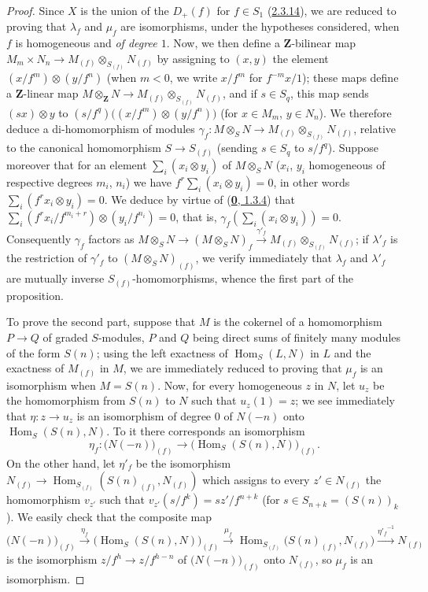 \begin{proof}
Since $X$ is the union of the $D_+(f)$ for $f\in S_1$
(\hyperref[II.2.3.14]{2.3.14}), we are reduced to proving that
$\lambda_f$ and $\mu_f$ are isomorphisms, under the hypotheses considered,
when $f$ is homogeneous and \emph{of degree $1$}. Now, we then define a
$\mathbf{Z}$-bilinear map $M_m\times N_n\longrightarrow M_{(f)}\otimes_{S_{(f)}}N_{(f)}$
by assigning to $(x,y)$ the element
$(x/f^m)\otimes(y/f^n)$ (when $m<0$, we write $x/f^m$ for
$f^{-m}x/1$); these maps define a
$\mathbf{Z}$-linear map $M\otimes_{\mathbf{Z}}N\longrightarrow M_{(f)}\otimes_{S_{(f)}}N_{(f)}$,
and if $s\in S_q$, this map sends $(sx)\otimes y$ to $(s/f^q)\bigl((x/f^m)\otimes(y/f^n)\bigr)$
(for $x\in M_m$, $y\in N_n$). We therefore deduce a di-homomorphism of
modules $\gamma_f:M\otimes_S N\longrightarrow M_{(f)}\otimes_{S_{(f)}}N_{(f)}$,
relative to the canonical homomorphism $S\to S_{(f)}$ (sending
$s\in S_q$ to $s/f^q$). Suppose moreover that for an element
$\sum_i(x_i\otimes y_i)$ of $M\otimes_S N$ ($x_i$, $y_i$ homogeneous of
respective degrees $m_i$, $n_i$) we have $f^r\sum_i(x_i\otimes y_i)=0$,
in other words $\sum_i(f^rx_i\otimes y_i)=0$. We deduce by virtue of
(\hyperref[0.1.3.4]{\textbf{0}, 1.3.4}) that $\sum_i(f^rx_i/f^{m_i+r})\otimes(y_i/f^{n_i})=0$,
that is, $\gamma_f(\sum_i(x_i\otimes y_i))=0$. Consequently $\gamma_f$
factors as $M\otimes_S N\longrightarrow(M\otimes_S N)_f\xrightarrow{\gamma'_f}M_{(f)}\otimes_{S_{(f)}}N_{(f)}$;
if $\lambda'_f$ is the restriction of $\gamma'_f$
to $(M\otimes_S N)_{(f)}$, we verify immediately that $\lambda_f$ and
$\lambda'_f$ are mutually inverse $S_{(f)}$-homomorphisms, whence the
first part of the proposition.

To prove the second part, suppose that $M$ is the cokernel of a
homomorphism $P\to Q$ of graded $S$-modules, $P$ and $Q$ being direct
sums of finitely many modules of the form $S(n)$; using
the left exactness of $\operatorname{Hom}_S(L,N)$ in $L$ and the exactness
of $M_{(f)}$ in $M$, we are immediately reduced to proving that $\mu_f$ is
an isomorphism when $M=S(n)$. Now, for every homogeneous $z$ in $N$, let
$u_z$ be the homomorphism from $S(n)$ to $N$ such that $u_z(1)=z$; we see
immediately that $\eta:z\to u_z$ is an isomorphism of degree $0$ of
$N(-n)$ onto $\operatorname{Hom}_S(S(n),N)$. To it there corresponds an
isomorphism
\[
  \eta_f:\bigl(N(-n)\bigr)_{(f)}
  \longrightarrow
  \bigl(\operatorname{Hom}_S(S(n),N)\bigr)_{(f)}.
\]
On the other hand, let $\eta'_f$ be the isomorphism $N_{(f)}\to\operatorname{Hom}_{S_{(f)}}(S(n)_{(f)},N_{(f)})$
which assigns to every $z'\in N_{(f)}$ the homomorphism $v_{z'}$ such
that $v_{z'}(s/f^k)=sz'/f^{n+k}$ (for
$s\in S_{n+k}=(S(n))_k$). We easily check that the composite map
\[
  \bigl(N(-n)\bigr)_{(f)}
  \xrightarrow{\eta_f}
  \bigl(\operatorname{Hom}_S(S(n),N)\bigr)_{(f)}
  \xrightarrow{\mu_f}
  \operatorname{Hom}_{S_{(f)}}\bigl(S(n)_{(f)},N_{(f)}\bigr)
  \xrightarrow{{\eta'_f}^{-1}}N_{(f)}
\]
is the isomorphism $z/f^h\to z/f^{h-n}$ of
$\bigl(N(-n)\bigr)_{(f)}$ onto $N_{(f)}$, so $\mu_f$ is an isomorphism.
\end{proof}

